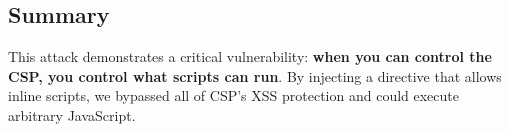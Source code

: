 \documentclass{article}
\begin{document}
\begin{itemize}
\section{Summary}

\begin{tcolorbox}[title=Key Takeaway]
This attack demonstrates a critical vulnerability: \textbf{when you can control the CSP, you control what scripts can run}. By injecting a directive that allows inline scripts, we bypassed all of CSP's XSS protection and could execute arbitrary JavaScript.
\end{tcolorbox}





\end{itemize}
\end{document}
